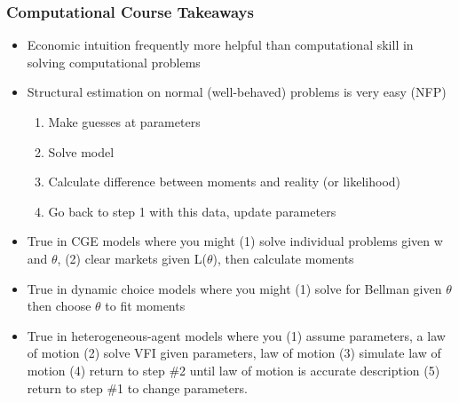 \documentclass{beamer}
\begin{document}
\begin{frame}
\frametitle[alignment=center]{Computational Course Takeaways}
\small
\begin{itemize}
\item Economic intuition frequently more helpful than computational skill in solving computational problems
\item Structural estimation on normal (well-behaved) problems is very easy (NFP)
\begin{enumerate}
\item Make guesses at parameters
\item Solve model
\item Calculate difference between moments and reality (or likelihood)
\item Go back to step 1 with this data, update parameters
\end{enumerate}
\item True in CGE models where you might (1) solve individual problems given w and $\theta$, (2) clear markets given L($\theta$), then calculate moments
\item True in dynamic choice models where you might (1) solve for Bellman given $\theta$  then choose $\theta$ to fit moments
\item True in heterogeneous-agent models where you (1) assume parameters, a law of motion (2) solve VFI given parameters, law of motion (3) simulate law of motion (4) return to step \#2 until law of motion is accurate description (5) return to step \#1 to change parameters.
\end{itemize}
\end{frame}
\end{document}
